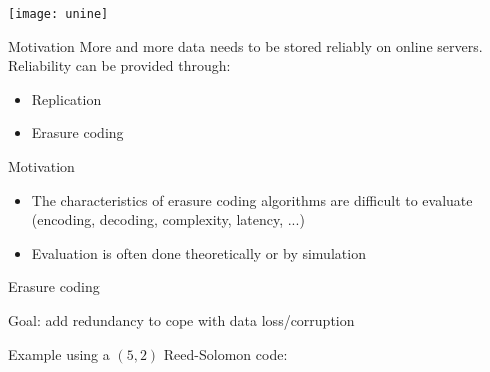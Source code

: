 {}




\begin{frame}[plain]
  
\titlepage

\begin{center}
\texttt{[image: unine]}
\end{center}

\end{frame}


\subtitle[Introduction]{Introduction}

\begin{frame}{Motivation}
    More and more data needs to be stored reliably on online servers.
    Reliability can be provided through:
    \begin{itemize}
        \item<1> Replication
        \item<1-2> Erasure coding
    \end{itemize}
\end{frame}

\begin{frame}{Motivation}
  \begin{itemize}
  \item  The characteristics of erasure coding algorithms are difficult to evaluate (encoding, decoding, complexity, latency, ...)
  \item  Evaluation is often done theoretically or by simulation
  \end{itemize}

\end{frame}

\begin{frame}{Erasure coding}
    \begin{snugshade}
        Goal: add redundancy to cope with data loss/corruption
    \end{snugshade}

    Example using a $\left(5,2\right)$ Reed-Solomon code:
    \begin{figure}
    
    \end{figure}
\end{frame}

